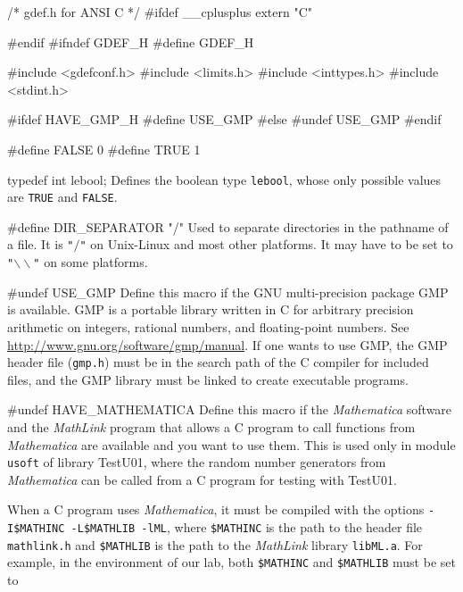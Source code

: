 \code\hide
/* gdef.h  for ANSI C */
#ifdef __cplusplus
extern "C" {
#endif
#ifndef GDEF_H
#define GDEF_H

#include <gdefconf.h>
#include <limits.h>
#include <inttypes.h>
#include <stdint.h>

#ifdef HAVE_GMP_H
#define USE_GMP
#else
#undef USE_GMP
#endif
\endhide
\endcode


\code
#define FALSE 0
#define TRUE 1

typedef int lebool;
\endcode
  \tab Defines the boolean type \texttt{lebool}, whose only possible values are
  {\tt TRUE} and {\tt FALSE}.
 \endtab
\code

#define DIR_SEPARATOR "/"
\endcode
  \tab Used to separate directories in the pathname of a file.
  It is \texttt{"$/$"} on {Unix-Linux} and most other platforms. 
  It may have to be set to \texttt{"$\backslash\backslash$"} on some platforms.
 \endtab
\code

#undef USE_GMP
\endcode
  \tab  Define this macro if the GNU multi-precision package GMP
  is available.  GMP is a portable library written in C for arbitrary
  precision arithmetic on integers, rational numbers, and floating-point numbers. 
	See \url{http://www.gnu.org/software/gmp/manual}. 
	If one wants to use GMP, the GMP header file (\texttt{gmp.h}) must be in the  search path 
  of the C compiler for included files, and the GMP library must be 
  linked to create executable programs.
 \endtab
\iffalse   %
\code

#undef HAVE_MATHEMATICA
\endcode
  \tab  Define this macro if the {\em Mathematica\/}
    software \cite{mWOL96a}
   and the {\em MathLink} program that allows a C program to call
   functions from {\em Mathematica} are available and you want to use them.
   This is used only in module \texttt{usoft} 
   of library TestU01, where the random number generators from 
   {\em Mathematica} can be called from a C program for testing with TestU01.

   When a C program uses {\em Mathematica}, it must be compiled with the
    options
   \texttt{-I\$MATHINC -L\$MATHLIB -lML}, where 
   \texttt{\$MATHINC} is the path to the header file \texttt{mathlink.h} and 
   \texttt{\$MATHLIB} is the path to the {\em MathLink\/} library \texttt{libML.a}.
   For example, in the environment of our lab, both 
   \texttt{\$MATHINC} and \texttt{\$MATHLIB} must be set to

}
